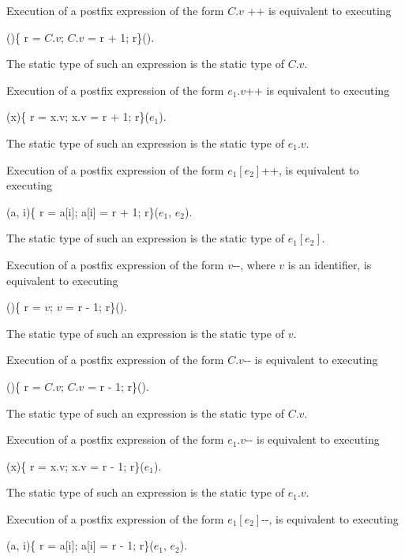 \documentclass{article}
\newcommand{\code}[1]{{\sf #1}}
\begin{document}

\LMHash{}
Execution of a postfix expression of the form \code{$C.v$ ++} is equivalent to executing 

\code{()\{\VAR{} r = $C.v$; $C.v$ = r + 1; \RETURN{} r\}()}.

\LMHash{}
The static type of such an expression is the static type of $C.v$.


\LMHash{}
Execution of a postfix expression of the form \code{$e_1.v$++} is equivalent to executing 

\code{(x)\{\VAR{} r = x.v; x.v = r + 1; \RETURN{} r\}($e_1$)}.

\LMHash{}
The static type of such an expression is the static type of $e_1.v$.


\LMHash{}
Execution of a postfix expression of the form \code{$e_1[e_2]$++},  is equivalent to executing 

\code{(a, i)\{\VAR{} r = a[i]; a[i] = r + 1; \RETURN{} r\}($e_1$, $e_2$)}.

\LMHash{}
The static type of such an expression is the static type of $e_1[e_2]$.


\LMHash{}
Execution of a postfix expression of the form \code{$v$-{}-}, where $v$ is an identifier, is equivalent to executing 

\code{()\{\VAR{} r = $v$; $v$ = r - 1; \RETURN{} r\}()}.

\LMHash{}
The static type of such an expression is the static type of $v$.


\LMHash{}
Execution of a postfix expression of the form \code{$C.v$-{}-} is equivalent to executing 

\code{()\{\VAR{} r = $C.v$; $C.v$ = r - 1; \RETURN{} r\}()}.

\LMHash{}
The static type of such an expression is the static type of $C.v$.


\LMHash{}
Execution of a postfix expression of the form \code{$e_1.v$-{}-} is equivalent to executing 

\code{(x)\{\VAR{} r = x.v; x.v = r - 1; \RETURN{} r\}($e_1$)}.

\LMHash{}
The static type of such an expression is the static type of $e_1.v$.


\LMHash{}
Execution of a postfix expression of the form \code{$e_1[e_2]$-{}-},  is equivalent to executing 

\code{(a, i)\{\VAR{} r = a[i]; a[i] = r - 1; \RETURN{} r\}($e_1$, $e_2$)}.
\end{document}
